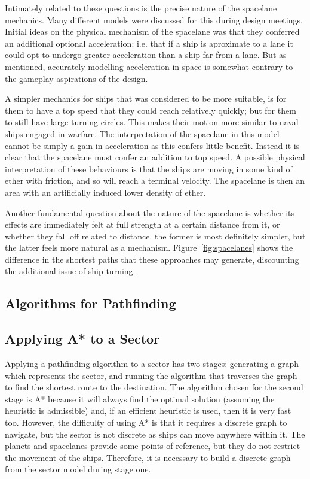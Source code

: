 Intimately related to these questions is the precise nature of the spacelane mechanics. Many different models were discussed for this during design meetings. Initial ideas on the physical mechanism of the spacelane was that they conferred an additional optional acceleration: i.e. that if a ship is aproximate to a lane it could opt to undergo greater acceleration than a ship far from a lane. But as mentioned, accurately modelling acceleration in space is somewhat contrary to the gameplay aspirations of the design. 

A simpler mechanics for ships that was considered to be more suitable, is for them to have a top speed that they could reach relatively quickly; but for them to still have large turning circles. This makes their motion more similar to naval ships engaged in warfare. The interpretation of the spacelane in this model cannot be simply a gain in acceleration as this confers little benefit. Instead it is clear that the spacelane must confer an addition to top speed. A possible physical interpretation of these behaviours is that the ships are moving in some kind of ether with friction, and so will reach a terminal velocity. The spacelane is then an area with an artificially induced lower density of ether.

Another fundamental question about the nature of the spacelane is whether its effects are immediately felt at full strength at a certain distance from it, or whether they fall off related to distance. the former is most definitely simpler, but the latter feels more natural as a mechanism. Figure~\ref{fig:spacelanes} shows the difference in the shortest paths that these approaches may generate, discounting the additional issue of ship turning.

\subsection{Algorithms for Pathfinding}

\subsection{Applying A* to a Sector}

Applying a pathfinding algorithm to a sector has two stages: generating a graph which represents the sector, and running the algorithm that traverses the graph to find the shortest route to the destination. The algorithm chosen for the second stage is A* because it will always find the optimal solution (assuming the heuristic is admissible) and, if an efficient heuristic is used, then it is very fast too. However, the difficulty of using A* is that it requires a discrete graph to navigate, but the sector is not discrete as ships can move anywhere within it. The planets and spacelanes provide some points of reference, but they do not restrict the movement of the ships. Therefore, it is necessary to build a discrete graph from the sector model during stage one.

